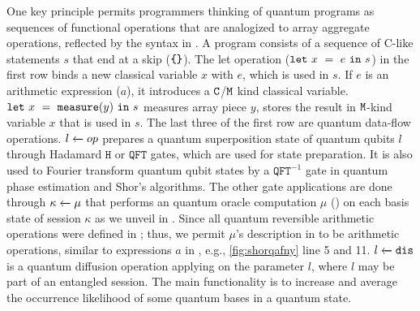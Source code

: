 One key \qafny principle permits programmers thinking of quantum programs as sequences of functional operations that are analogized to array aggregate operations, reflected by the \qafny syntax in .
A program consists of a sequence of C-like statements $s$ that end at a skip ($\texttt{\{\}}$).
The let operation ($\texttt{let}~{x}~=~{e}~\texttt{in}~{s}$) in the first row binds a new classical variable $x$ with $e$, which is used in $s$. If $e$ is an arithmetic expression ($a$), it introduces a $\texttt{C}$/$\texttt{M}$ kind classical variable.
$\texttt{let}~{x}~=~{\texttt{measure}(y)}~\texttt{in}~{s}$ measures array piece $y$, stores the result in $\texttt{M}$-kind variable $x$ that is used in $s$.
The last three of the first row are quantum data-flow operations.
${l} \xleftarrow{} {op}$ prepares a quantum superposition state of quantum qubits $l$ through Hadamard $\texttt{H}$ or $\texttt{QFT}$ gates, which are used for state preparation. It is also used to Fourier transform quantum qubit states by a $\texttt{QFT}^{-1}$ gate in quantum phase estimation and Shor's algorithms.
The other gate applications are done through ${\kappa} \xleftarrow{} {\mu}$ that performs an \oqasm quantum oracle computation $\mu$ (\cite{oracleoopsla}) on each basis state of session $\kappa$ as we unveil in . Since all quantum reversible arithmetic operations were defined in \oqasm; thus, we permit $\mu$'s description in \qafny to be arithmetic operations, similar to expressions $a$ in , e.g., \cref{fig:shorqafny} line 5 and 11.
${l} \xleftarrow{} {\texttt{dis}}$ is a quantum diffusion operation applying on the parameter $l$, where $l$ may be part of an entangled session.
The main functionality is to increase and average the occurrence likelihood of some quantum bases in a quantum state.

